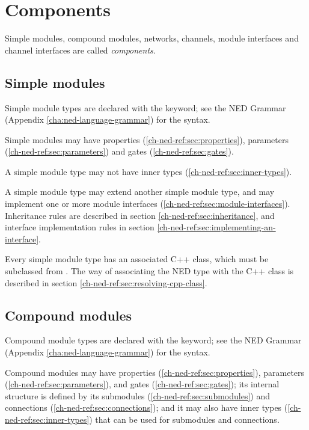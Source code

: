 \section{Components}

Simple modules, compound modules, networks, channels, module interfaces
and channel interfaces are called \textit{components}.


\subsection{Simple modules}

Simple module types are declared with the  keyword;
see the NED Grammar (Appendix \ref{cha:ned-language-grammar}) for the
syntax.

Simple modules may have properties (\ref{ch-ned-ref:sec:properties}),
parameters (\ref{ch-ned-ref:sec:parameters})
and gates (\ref{ch-ned-ref:sec:gates}).

A simple module type may not have inner types (\ref{ch-ned-ref:sec:inner-types}).

A simple module type may extend another simple module type, and
may implement one or more module interfaces (\ref{ch-ned-ref:sec:module-interfaces}).
Inheritance rules are described in section \ref{ch-ned-ref:sec:inheritance},
and interface implementation rules in section \ref{ch-ned-ref:sec:implementing-an-interface}.

Every simple module type has an associated C++ class, which must be
subclassed from . The way of associating the
NED type with the C++ class is described in section
\ref{ch-ned-ref:sec:resolving-cpp-class}.



\subsection{Compound modules}
\label{ch-ned-ref:sec:compound-modules}

Compound module types are declared with the  keyword;
see the NED Grammar (Appendix \ref{cha:ned-language-grammar}) for the
syntax.

Compound modules may have properties (\ref{ch-ned-ref:sec:properties}),
parameters (\ref{ch-ned-ref:sec:parameters}),
and gates (\ref{ch-ned-ref:sec:gates}); its internal structure is defined by
its submodules (\ref{ch-ned-ref:sec:submodules}) and
connections (\ref{ch-ned-ref:sec:connections});
and it may also have inner types (\ref{ch-ned-ref:sec:inner-types})
that can be used for submodules and connections.


